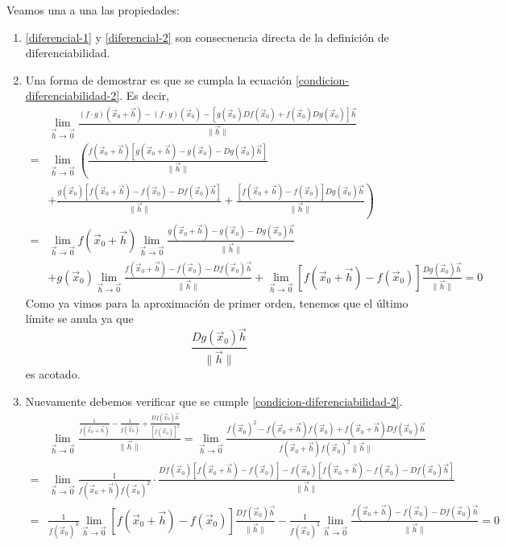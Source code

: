 \begin{demostracion}
Veamos una a una las propiedades:
\begin{enumerate}
\item \eqref{diferencial-1} y \eqref{diferencial-2} son consecuencia directa de la definici\'on de diferenciabilidad.
\item Una forma de demostrar es que se cumpla la ecuaci\'on \eqref{condicion-diferenciabilidad-2}. Es decir,
\begin{align*}
& \lim_{\vec{h}\to \vec{0}} \frac{(f\cdot g)(\vec{x}_0 + \vec{h}) - (f\cdot g)(\vec{x}_0) - [g(\vec{x}_0)Df(\vec{x}_0)+f(\vec{x}_0)Dg(\vec{x}_0)]\vec{h}}{\|\vec{h}\|} \\
= & \lim_{\vec{h}\to \vec{0}} \left( \frac{f(\vec{x}_0+\vec{h})[g(\vec{x}_0+\vec{h})-g(\vec{x}_0)-Dg(\vec{x}_0)\vec{h}]}{\|\vec{h}\|} \right. \\ 
&+  \frac{g(\vec{x}_0)[f(\vec{x}_0+\vec{h})-f(\vec{x}_0)-Df(\vec{x}_0)\vec{h}]}{\|\vec{h}\|} + \left. \frac{[f(\vec{x}_0+\vec{h})-f(\vec{x}_0)]Dg(\vec{x}_0)\vec{h}}{\|\vec{h}\|}\right) \\
= & \lim_{\vec{h}\to \vec{0}} f(\vec{x}_0+\vec{h}) \lim_{\vec{h}\to \vec{0}} \frac{g(\vec{x}_0+\vec{h})-g(\vec{x}_0)-Dg(\vec{x}_0)\vec{h}}{\|\vec{h}\|} \\ 
&+  g(\vec{x}_0) \lim_{\vec{h}\to \vec{0}} \frac{f(\vec{x}_0+\vec{h})-f(\vec{x}_0)-Df(\vec{x}_0)\vec{h}}{\|\vec{h}\|} + \lim_{\vec{h}\to \vec{0}} [f(\vec{x}_0+\vec{h})-f(\vec{x}_0)]\frac{Dg(\vec{x}_0)\vec{h}}{\|\vec{h}\|} = 0
\end{align*}
Como ya vimos para la aproximaci\'on de primer orden, tenemos que el \'ultimo l\'imite se anula ya que $$\frac{Dg(\vec{x}_0)\vec{h}}{\|\vec{h}\|}$$ es acotado.

\item Nuevamente debemos verificar que se cumple \eqref{condicion-diferenciabilidad-2}.
\begin{align*}
&\lim_{\vec{h}\to \vec{0}} \frac{\frac{1}{f(\vec{x}_0+\vec{h})}-\frac{1}{f(\vec{x}_0)} + \frac{Df(\vec{x}_0)\vec{h}}{[f(\vec{x}_0)]^2}}{\|\vec{h}\|} = \lim_{\vec{h}\to \vec{0}} \frac{f(\vec{x}_0)^2-f(\vec{x}_0+\vec{h})f(\vec{x}_0)+f(\vec{x}_0+\vec{h})Df(\vec{x}_0)\vec{h}}{f(\vec{x}_0+\vec{h})f(\vec{x}_0)^2 \|\vec{h}\|} \\
=& \lim_{\vec{h}\to \vec{0}} \frac{1}{f(\vec{x}_0+\vec{h})f(\vec{x}_0)^2}\cdot \frac{Df(\vec{x}_0)[f(\vec{x}_0+\vec{h})-f(\vec{x}_0)] - f(\vec{x}_0)[f(\vec{x}_0+\vec{h})-f(\vec{x}_0)-Df(\vec{x}_0)\vec{h}]}{\|\vec{h}\|} \\
=& \frac{1}{f(\vec{x}_0)^3} \lim_{\vec{h}\to \vec{0}} [f(\vec{x}_0 + \vec{h})-f(\vec{x}_0)] \frac{Df(\vec{x}_0)\vec{h}}{\|\vec{h}\|} - \frac{1}{f(\vec{x}_0)^2} \lim_{\vec{h}\to \vec{0}} \frac{f(\vec{x}_0+\vec{h})-f(\vec{x}_0)-Df(\vec{x}_0)\vec{h}}{\|\vec{h}\|} = 0
\end{align*}
\end{enumerate}
\end{demostracion}

